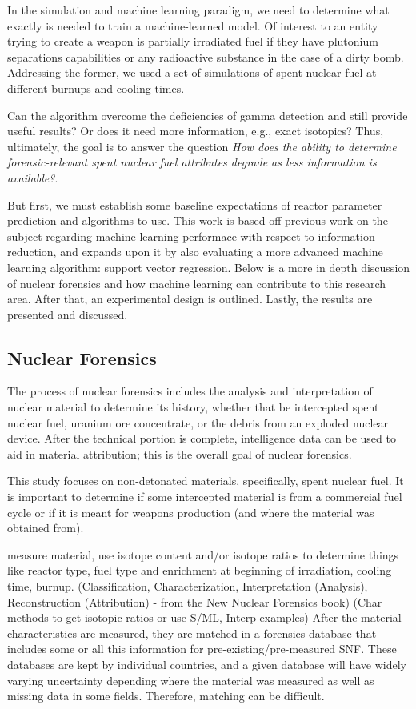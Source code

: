 \documentclass{anstrans}
\begin{document}
In the simulation and machine
learning paradigm, we need to determine what exactly is needed to train a
machine-learned model. Of interest to an entity trying to create a weapon is
partially irradiated fuel if they have plutonium separations capabilities or
any radioactive substance in the case of a dirty bomb. Addressing the former,
we used a set of simulations of spent nuclear fuel at different burnups and
cooling times. 

Can the algorithm overcome the deficiencies of gamma detection and still
provide useful results? Or does it need more information, e.g., exact
isotopics? Thus, ultimately, the goal is to answer the question \textit{How
does the ability to determine forensic-relevant spent nuclear fuel attributes
degrade as less information is available?}. 

But first, we must establish some baseline expectations of reactor parameter
prediction and algorithms to use.  This work is based off previous work on the
subject \cite{dayman_2013} regarding machine learning performace with respect to
information reduction, and expands upon it by also evaluating a more advanced
machine learning algorithm: support vector regression. Below is a more in depth
discussion of nuclear forensics and how machine learning can contribute to this
research area. After that, an experimental design is outlined. Lastly, the
results are presented and discussed. 

\subsection{Nuclear Forensics}

The process of nuclear forensics includes the analysis and interpretation of
nuclear material to determine its history, whether that be intercepted spent
nuclear fuel, uranium ore concentrate, or the debris from an exploded nuclear
device. After the technical portion is complete, intelligence data can be used
to aid in material attribution; this is the overall goal of nuclear forensics. 

This study focuses on non-detonated materials, specifically, spent nuclear
fuel. It is important to determine if some intercepted material is from a
commercial fuel cycle or if it is meant for weapons production (and where the
material was obtained from). 

measure material, use
isotope content and/or isotope ratios to determine things like reactor type,
fuel type and enrichment at beginning of irradiation, cooling time, burnup.
(Classification, Characterization, Interpretation (Analysis), Reconstruction
(Attribution) - from the New Nuclear Forensics book) (Char methods to get
isotopic ratios or use S/ML, Interp examples) After the material
characteristics are measured, they are matched in a forensics database that
includes some or all this information for pre-existing/pre-measured SNF. These
databases are kept by individual countries, and a given database will have
widely varying uncertainty depending where the material was measured as well as
missing data in some fields.  Therefore, matching can be difficult.
\end{document}
